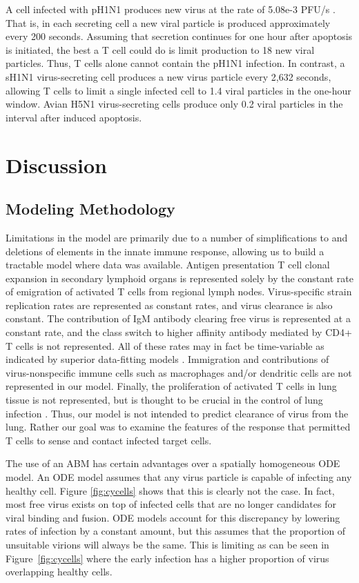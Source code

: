 \documentclass[10pt]{article}
\begin{document}
A cell infected with pH1N1 produces new virus at the rate of 5.08e-3 PFU/s \cite{Mitchell2011}.  That is, in each secreting cell a new viral particle is produced approximately every 200 seconds.  Assuming that secretion continues for one hour after apoptosis is initiated, the best a T cell could do is limit production to 18 new viral particles.  Thus, T cells alone cannot contain the pH1N1 infection.  In contrast, a sH1N1 virus-secreting cell produces a new virus particle every 2,632 seconds, allowing T cells to limit a single infected cell to 1.4 viral particles in the one-hour window.  Avian H5N1 virus-secreting cells produce only 0.2 viral particles in the interval after induced apoptosis. 


\section*{Discussion}

\subsection*{Modeling Methodology}

Limitations in the model are primarily due to a number of simplifications to and deletions of elements in the innate immune response, allowing us to build a tractable model where data was available.  Antigen presentation T cell clonal expansion in secondary lymphoid organs is represented solely by the constant rate of emigration of activated T cells from regional lymph nodes.  Virus-specific strain replication rates are represented as constant rates, and virus clearance is also constant.  The contribution of IgM antibody clearing free virus is represented at a constant rate, and the class switch to higher affinity antibody mediated by CD4+ T cells is not represented.  All of these rates may in fact be time-variable as indicated by superior data-fitting models \cite{Wu2011}.  Immigration and contributions of virus-nonspecific immune cells such as macrophages and/or dendritic cells are not represented in our model.  Finally, the proliferation of activated T cells in lung tissue is not represented, but is thought to be crucial in the control of lung infection \cite{Miao2010}.  Thus, our model is not intended to predict clearance of virus from the lung.  Rather our goal was to examine the features of the response that permitted T cells to sense and contact infected target cells.

The use of an ABM has certain advantages over a spatially homogeneous ODE model.  An ODE model assumes that any virus particle is capable of infecting any healthy cell.  Figure \ref{fig:cycells} shows that this is clearly not the case.  In fact, most free virus exists on top of infected cells that are no longer candidates for viral binding and fusion.  ODE models account for this discrepancy by lowering rates of infection by a constant amount, but this assumes that the proportion of unsuitable virions will always be the same.  This is limiting as can be seen in Figure~\ref{fig:cycells} where the early infection has a higher proportion of virus overlapping healthy cells.
\end{document}
